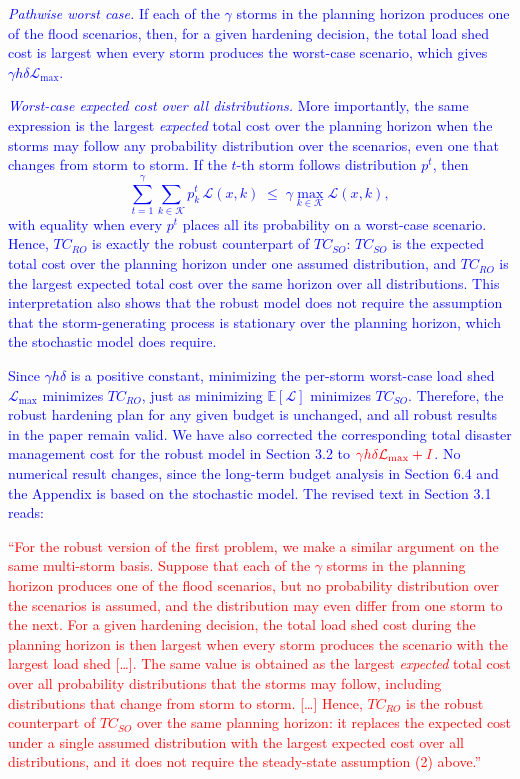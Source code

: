 \documentclass[authoryear,preprint,review,12pt]{elsarticle}\usepackage{amssymb}
\begin{document}
\textcolor{blue}{\textit{Pathwise worst case.} If each of the $\gamma$ storms in the planning horizon produces one of the flood scenarios, then, for a given hardening decision, the total load shed cost is largest when every storm produces the worst-case scenario, which gives $\gamma h \delta \mathcal{L}_{\max}$.}

\textcolor{blue}{\textit{Worst-case expected cost over all distributions.} More importantly, the same expression is the largest \emph{expected} total cost over the planning horizon when the storms may follow any probability distribution over the scenarios, even one that changes from storm to storm. If the $t$-th storm follows distribution $p^t$, then
\begin{equation*}
    \sum_{t=1}^{\gamma} \sum_{k \in \mathcal{K}} p^t_k \, \mathcal{L}(x,k) \;\leq\; \gamma \max_{k \in \mathcal{K}} \mathcal{L}(x,k),
\end{equation*}
with equality when every $p^t$ places all its probability on a worst-case scenario. Hence, $TC_{RO}$ is exactly the robust counterpart of $TC_{SO}$: $TC_{SO}$ is the expected total cost over the planning horizon under one assumed distribution, and $TC_{RO}$ is the largest expected total cost over the same horizon over all distributions. This interpretation also shows that the robust model does not require the assumption that the storm-generating process is stationary over the planning horizon, which the stochastic model does require.}

\textcolor{blue}{Since $\gamma h \delta$ is a positive constant, minimizing the per-storm worst-case load shed $\mathcal{L}_{\max}$ minimizes $TC_{RO}$, just as minimizing $\mathbb{E}[\mathcal{L}]$ minimizes $TC_{SO}$. Therefore, the robust hardening plan for any given budget is unchanged, and all robust results in the paper remain valid. We have also corrected the corresponding total disaster management cost for the robust model in Section 3.2 to $\textcolor{red}{\gamma h \delta \mathcal{L}_{\max} + I}$. No numerical result changes, since the long-term budget analysis in Section 6.4 and the Appendix is based on the stochastic model. The revised text in Section 3.1 reads:}

\textcolor{red}{``For the robust version of the first problem, we make a similar argument on the same multi-storm basis. Suppose that each of the $\gamma$ storms in the planning horizon produces one of the flood scenarios, but no probability distribution over the scenarios is assumed, and the distribution may even differ from one storm to the next. For a given hardening decision, the total load shed cost during the planning horizon is then largest when every storm produces the scenario with the largest load shed [\ldots]. The same value is obtained as the largest \emph{expected} total cost over all probability distributions that the storms may follow, including distributions that change from storm to storm. [\ldots] Hence, $TC_{RO}$ is the robust counterpart of $TC_{SO}$ over the same planning horizon: it replaces the expected cost under a single assumed distribution with the largest expected cost over all distributions, and it does not require the steady-state assumption (2) above.''}
\end{document}
